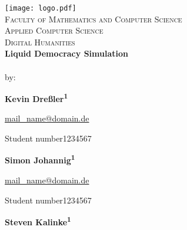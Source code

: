 \begin{titlepage}	%
	\begin{center}
		\libertineOsF
		\vspace*{0.1cm}
		\texttt{[image: logo.pdf]}\\[0.75cm]
		\normalsize{\textsc{Faculty of Mathematics and Computer Science\\Applied Computer Science\\Digital Humanities}}\\[1.25cm]
		\huge{\textbf{Liquid Democracy Simulation}}\\[0.75cm]
		\normalsize{\\[1cm]
			by:}
		
	\vspace*{\fill} 
	\begin{minipage}[t]{.6\textwidth}
		\large{\textbf{Kevin Dreßler\textsuperscript{1}}} \vspace*{0.3cm}
		
		\begin{normalsize}
			\href{mailto:mail_name@domain.de}{mail\_name@domain.de} %
			
			\libertineLF
			{\footnotesize Student number\enspace{}1234567} \vspace*{1cm}
		\end{normalsize}
	\end{minipage}%
	\begin{minipage}[t]{.4\textwidth}
		\large{\textbf{Simon Johannig\textsuperscript{1}}} \vspace*{0.3cm}
		
		\begin{normalsize}
			\href{mailto:mail_name@domain.de}{mail\_name@domain.de} %
			
			\libertineLF
			{\footnotesize Student number\enspace{}1234567} \vspace*{1cm}
		\end{normalsize}
	\end{minipage}
		\begin{minipage}[t]{.6\textwidth}
		\large{\textbf{Steven Kalinke\textsuperscript{1}}} \vspace*{0.3cm}
		

\end{minipage}
\end{center}
\end{titlepage}
